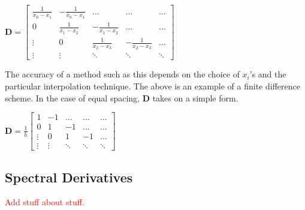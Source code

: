 \documentclass[12pt,letterpaper]{article}
\begin{document}
\begin{center}
$
\boldsymbol{D}
=
\begin{bmatrix}
	\frac{1}{x_0 - x_1} & -\frac{1}{x_0 - x_1} & \dots & \dots & \dots \\ 
	0 & \frac{1}{x_1 - x_2} & -\frac{1}{x_1 - x_2} & \dots & \dots \\
	\vdots & 0 & \frac{1}{x_2 - x_3} & -\frac{1}{x_2 - x_3} & \dots \\
	\vdots & \vdots & \ddots & \ddots & \ddots
\end{bmatrix}
$
\end{center}

The accuracy of a method such as this depends on the choice of $x_i$'s and the particular interpolation technique. The above is an example of a finite difference scheme. In the case of equal spacing, $\boldsymbol{D}$ takes on a simple form.

\begin{center}
$
\boldsymbol{D}
= \frac{1}{h}
\begin{bmatrix}
	1 & -1 & \dots & \dots & \dots \\ 
	0 & 1 & -1 & \dots & \dots \\
	\vdots & 0 & 1 & -1 & \dots \\
	\vdots & \vdots & \ddots & \ddots & \ddots
\end{bmatrix}
$
\end{center}

\subsection{Spectral Derivatives}
\begin{center}
\textcolor{red}{Add stuff about stuff.}
\end{center}
\end{document}
